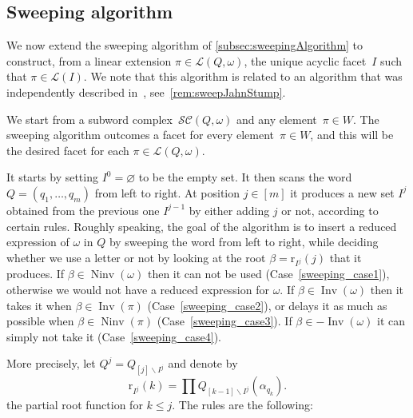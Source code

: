 \documentclass[reqno]{amsart}
\theoremstyle{definition}
\newcommand{\ssm}{\smallsetminus} %
\DeclareMathOperator{\Inv}{Inv} %
\DeclareMathOperator{\Ninv}{Ninv} %
\newcommand{\linearExtensions}{\mathcal{L}} %
\newcommand{\subwordComplex}{\mathcal{SC}} %
\newcommand{\rootFunction}[2]{\mathrm{r}_{#1}(#2)} %
\newcommand{\subwordFacets}{\mathcal{F}} %
\newcommand{\sweepingAlgorithm}{\mathsf{sweep}} %
\begin{document}

\subsection{Sweeping algorithm}
\label{subsec:sweepingAlgorithmSubwordComplexes}

We now extend the sweeping algorithm of \cref{subsec:sweepingAlgorithm} to construct, from a linear extension $\pi \in \linearExtensions(Q,\omega)$, the unique acyclic facet~$I$ such that $\pi \in \linearExtensions(I)$.
We note that this algorithm is related to an algorithm that was independently described in~\cite{JahnStump}, see~\cref{rem:sweepJahnStump}.

We start from a subword complex~$\subwordComplex(Q, \omega)$ and any element~$\pi \in W$.
The sweeping algorithm outcomes a facet for every element~$\pi \in W$, and this will be the desired facet for each $\pi \in \linearExtensions(Q,\omega)$.

It starts by setting $I^0=\varnothing$ to be the empty set.
It then scans the word $Q=(q_1,\dots ,q_m)$ from left to right.
At position $j\in [m]$ it produces a new set $I^j$ obtained from the previous one $I^{j-1}$ by either adding $j$ or not, according to certain rules.
Roughly speaking, the goal of the algorithm is to insert a reduced expression of $\omega$ in $Q$ by sweeping the word from left to right, while deciding whether we use a letter or not by looking at the root $\beta=\rootFunction{I^j}{j}$ that it produces.
If $\beta \in \Ninv(\omega)$ then it can not be used (Case~\ref{sweeping_case1}), otherwise we would not have a reduced expression for $\omega$.
If $\beta \in \Inv(\omega)$ then it takes it when $\beta \in \Inv(\pi)$ (Case~\ref{sweeping_case2}), or delays it as much as possible when $\beta \in \Ninv(\pi)$ (Case~\ref{sweeping_case3}).
If $\beta \in -\Inv(\omega)$ it can simply not take it (Case~\ref{sweeping_case4}).

More precisely, let $Q^j=Q_{[j]\ssm I^j}$ and denote by
\[
\rootFunction{I^j}{k} = \prod Q_{[k-1]\ssm I^j}(\alpha_{q_k}).
\]
the partial root function for $k\leq j$.  
The rules are the following:
\end{document}
